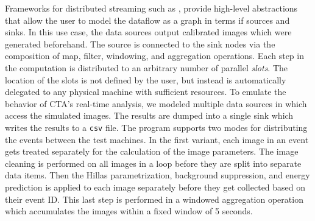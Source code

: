 Frameworks for distributed streaming such as \flink, provide high-level abstractions that allow the user to model the dataflow as a graph in terms if sources and sinks.
In this use case, the \flink data sources output calibrated images which were generated beforehand.
The source is connected to the sink nodes via the composition of map, filter, windowing, and aggregation operations.
Each step in the computation is distributed to an arbitrary number of parallel \emph{slots}. The location of the slots is not 
defined by the user, but instead is automatically delegated to any physical machine with sufficient resources.
To emulate the behavior of CTA's real-time analysis, we modeled multiple data sources in \jayct which access the simulated images.
The results are dumped into a single sink which writes the results to a \texttt{csv} file. 
The \jayct program supports two modes for distributing the events between the test machines.
In the first variant, each image in an event gets treated separately for the calculation of the image parameters.
The image cleaning is performed on all images in a loop before they are split into separate data items.
Then the Hillas parametrization, background suppression, and energy prediction is applied to each image separately before they get collected based on their event ID.
This last step is performed in a windowed aggregation operation which accumulates the images within a fixed window of 5 seconds. 
  



